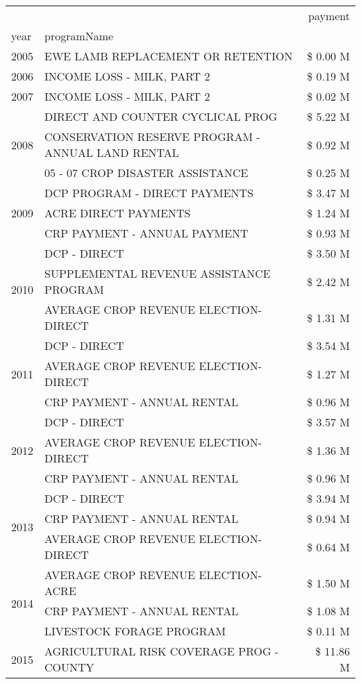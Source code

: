 \begin{tabular}{llr}
\toprule
 &  & payment \\
year & programName &  \\
\midrule
2005 & EWE LAMB REPLACEMENT OR RETENTION & \$ 0.00 M \\
\cline{1-3}
2006 & INCOME LOSS - MILK, PART 2 & \$ 0.19 M \\
\cline{1-3}
2007 & INCOME LOSS - MILK, PART 2 & \$ 0.02 M \\
\cline{1-3}
\multirow[t]{3}{*}{2008} & DIRECT AND COUNTER CYCLICAL PROG & \$ 5.22 M \\
 & CONSERVATION RESERVE PROGRAM - ANNUAL LAND RENTAL & \$ 0.92 M \\
 & 05 - 07 CROP DISASTER ASSISTANCE & \$ 0.25 M \\
\cline{1-3}
\multirow[t]{3}{*}{2009} & DCP PROGRAM - DIRECT PAYMENTS & \$ 3.47 M \\
 & ACRE DIRECT PAYMENTS & \$ 1.24 M \\
 & CRP PAYMENT - ANNUAL PAYMENT & \$ 0.93 M \\
\cline{1-3}
\multirow[t]{3}{*}{2010} & DCP - DIRECT & \$ 3.50 M \\
 & SUPPLEMENTAL REVENUE ASSISTANCE PROGRAM & \$ 2.42 M \\
 & AVERAGE CROP REVENUE ELECTION-DIRECT & \$ 1.31 M \\
\cline{1-3}
\multirow[t]{3}{*}{2011} & DCP - DIRECT & \$ 3.54 M \\
 & AVERAGE CROP REVENUE ELECTION-DIRECT & \$ 1.27 M \\
 & CRP PAYMENT - ANNUAL RENTAL & \$ 0.96 M \\
\cline{1-3}
\multirow[t]{3}{*}{2012} & DCP - DIRECT & \$ 3.57 M \\
 & AVERAGE CROP REVENUE ELECTION-DIRECT & \$ 1.36 M \\
 & CRP PAYMENT - ANNUAL RENTAL & \$ 0.96 M \\
\cline{1-3}
\multirow[t]{3}{*}{2013} & DCP - DIRECT & \$ 3.94 M \\
 & CRP PAYMENT - ANNUAL RENTAL & \$ 0.94 M \\
 & AVERAGE CROP REVENUE ELECTION-DIRECT & \$ 0.64 M \\
\cline{1-3}
\multirow[t]{3}{*}{2014} & AVERAGE CROP REVENUE ELECTION-ACRE & \$ 1.50 M \\
 & CRP PAYMENT - ANNUAL RENTAL & \$ 1.08 M \\
 & LIVESTOCK FORAGE PROGRAM & \$ 0.11 M \\
\cline{1-3}
\multirow[t]{3}{*}{2015} & AGRICULTURAL RISK COVERAGE PROG - COUNTY & \$ 11.86 M \\

\end{tabular}
